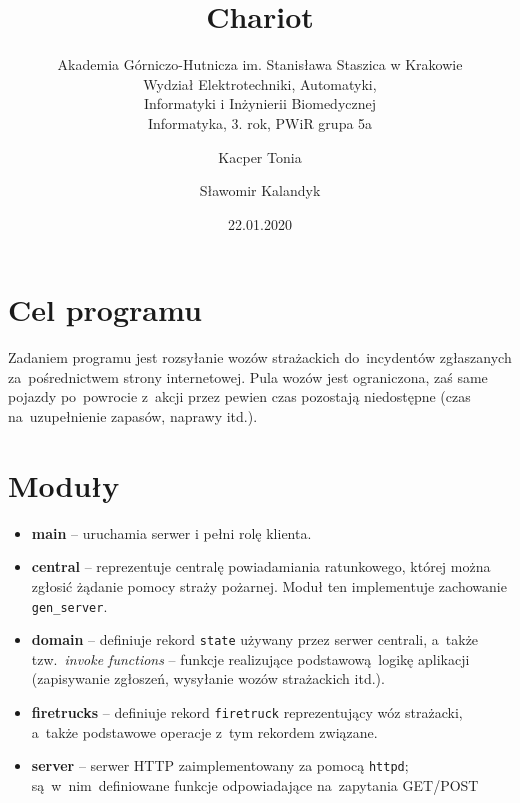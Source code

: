 \documentclass{article}
\title{Chariot}
\subtitle{Akademia Górniczo-Hutnicza im. Stanisława Staszica w Krakowie\\
	Wydział Elektrotechniki, Automatyki,\\
	Informatyki i Inżynierii Biomedycznej\\
	Informatyka, 3. rok, PWiR grupa 5a}
\author{Kacper Tonia\and
		Sławomir Kalandyk}
\date{22.01.2020}
\begin{document}
\maketitle

\section{Cel programu}
Zadaniem programu jest rozsyłanie wozów strażackich do~incydentów zgłaszanych za~pośrednictwem strony internetowej. Pula wozów jest ograniczona, zaś same pojazdy po~powrocie z~akcji przez pewien czas pozostają niedostępne (czas na~uzupełnienie zapasów, naprawy itd.).
\section{Moduły}
\begin{itemize}
	\item \textbf{main} -- uruchamia serwer i pełni rolę klienta.
	\item \textbf{central} -- reprezentuje centralę powiadamiania ratunkowego, której można zgłosić żądanie pomocy straży pożarnej. Moduł ten implementuje zachowanie \texttt{gen\_server}.
	\item \textbf{domain} -- definiuje rekord \texttt{state} używany przez serwer centrali, a~także tzw.~\emph{invoke functions} -- funkcje realizujące podstawową logikę aplikacji (zapisywanie zgłoszeń, wysyłanie wozów strażackich itd.).
	\item \textbf{firetrucks} -- definiuje rekord \texttt{firetruck} reprezentujący wóz strażacki, a~także podstawowe operacje z~tym rekordem związane.
	\item \textbf{server} -- serwer HTTP zaimplementowany za pomocą \texttt{httpd}; są~w~nim~definiowane funkcje odpowiadające na~zapytania GET/POST
\end{itemize}
\end{document}
